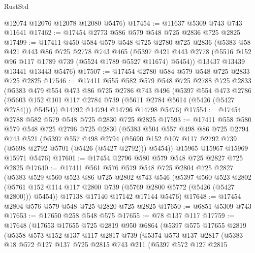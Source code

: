 \begin{lexlean}{RustStd}
\begin{coremodule}
      @12074
      @12076
      @12078
      @12080
      @5476)
@17454 := @11637 @5309 @743 @743 @11641
@17462 := @17454 @2773 @586 @579 @548 @725 @2836 @725 @2825
@17499 := @17411
    @450
    @584
    @579
    @548
    @725
    @2780
    @725
    @2836
    (@5383
      @58
      @421
      @443
      @86
      @725
      @2778
      @743
      @465
      (@5397 @421 @443 @2778 (@5516 @152 @96 @117 @1789 @739 (@5524 @1789 @5527 @11674) @5454))
      @13437
      @13439
      @13441
      @13443
      @5476)
@17507 := @17454 @2780 @584 @579 @548 @725 @2833 @725 @2825
@17546 := @17411
    @555
    @582
    @579
    @548
    @725
    @2788
    @725
    @2833
    (@5383
      @479
      @554
      @473
      @86
      @725
      @2786
      @743
      @496
      (@5397
        @554
        @473
        @2786
        (@5603 @152 @101 @117 @2784 @739 (@5611 @2784 @5614 (@5426 (@5427 @2784))) @5454))
      @14792
      @14794
      @14796
      @14798
      @5476)
@17554 := @17454 @2788 @582 @579 @548 @725 @2830 @725 @2825
@17593 := @17411
    @558
    @580
    @579
    @548
    @725
    @2796
    @725
    @2830
    (@5383
      @504
      @557
      @498
      @86
      @725
      @2794
      @743
      @521
      (@5397
        @557
        @498
        @2794
        (@5690 @152 @107 @117 @2792 @739 (@5698 @2792 @5701 (@5426 (@5427 @2792))) @5454))
      @15965
      @15967
      @15969
      @15971
      @5476)
@17601 := @17454 @2796 @580 @579 @548 @725 @2827 @725 @2825
@17640 := @17411
    @561
    @576
    @579
    @548
    @725
    @2804
    @725
    @2827
    (@5383
      @529
      @560
      @523
      @86
      @725
      @2802
      @743
      @546
      (@5397
        @560
        @523
        @2802
        (@5761 @152 @114 @117 @2800 @739 (@5769 @2800 @5772 (@5426 (@5427 @2800))) @5454))
      @17138
      @17140
      @17142
      @17144
      @5476)
@17648 := @17454 @2804 @576 @579 @548 @725 @2820 @725 @2825
@17650 := @6851 @5309 @743
@17653 := @17650 @258 @548 @575
@17655 := @78 @137 @117
@17759 := @17648
    (@17653
      @17655
      @725
      @2819
      @950
      @6864
      (@5397
        @575
        @17655
        @2819
        (@5358
          @573
          @152
          @137
          @117
          @2817
          @739
          (@5374
            @573
            @137
            @2817
            (@5383
              @18
              @572
              @127
              @137
              @725
              @2815
              @743
              @211
              (@5397
                @572
                @127
                @2815

\end{coremodule}
\end{lexlean}
